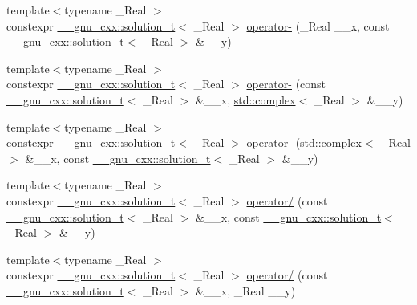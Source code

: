 \begin{DoxyCompactItemize}
\item 
{\footnotesize template$<$typename \+\_\+\+Real $>$ }\\constexpr \hyperlink{namespace____gnu__cxx_ae20ea642de50eb361074c62676b0159c}{\+\_\+\+\_\+gnu\+\_\+cxx\+::solution\+\_\+t}$<$ \+\_\+\+Real $>$ \hyperlink{namespacestd_ae02c419877b95950c8c9630c6a4971a1}{operator-\/} (\+\_\+\+Real \+\_\+\+\_\+x, const \hyperlink{namespace____gnu__cxx_ae20ea642de50eb361074c62676b0159c}{\+\_\+\+\_\+gnu\+\_\+cxx\+::solution\+\_\+t}$<$ \+\_\+\+Real $>$ \&\+\_\+\+\_\+y)
\item 
{\footnotesize template$<$typename \+\_\+\+Real $>$ }\\constexpr \hyperlink{namespace____gnu__cxx_ae20ea642de50eb361074c62676b0159c}{\+\_\+\+\_\+gnu\+\_\+cxx\+::solution\+\_\+t}$<$ \+\_\+\+Real $>$ \hyperlink{namespacestd_a308d96e2c3172aebb97f03880e8c5946}{operator-\/} (const \hyperlink{namespace____gnu__cxx_ae20ea642de50eb361074c62676b0159c}{\+\_\+\+\_\+gnu\+\_\+cxx\+::solution\+\_\+t}$<$ \+\_\+\+Real $>$ \&\+\_\+\+\_\+x, \hyperlink{classstd_1_1complex}{std\+::complex}$<$ \+\_\+\+Real $>$ \&\+\_\+\+\_\+y)
\item 
{\footnotesize template$<$typename \+\_\+\+Real $>$ }\\constexpr \hyperlink{namespace____gnu__cxx_ae20ea642de50eb361074c62676b0159c}{\+\_\+\+\_\+gnu\+\_\+cxx\+::solution\+\_\+t}$<$ \+\_\+\+Real $>$ \hyperlink{namespacestd_a4f4e9391eaa235d953faa99bff006e3d}{operator-\/} (\hyperlink{classstd_1_1complex}{std\+::complex}$<$ \+\_\+\+Real $>$ \&\+\_\+\+\_\+x, const \hyperlink{namespace____gnu__cxx_ae20ea642de50eb361074c62676b0159c}{\+\_\+\+\_\+gnu\+\_\+cxx\+::solution\+\_\+t}$<$ \+\_\+\+Real $>$ \&\+\_\+\+\_\+y)
\item 
{\footnotesize template$<$typename \+\_\+\+Real $>$ }\\constexpr \hyperlink{namespace____gnu__cxx_ae20ea642de50eb361074c62676b0159c}{\+\_\+\+\_\+gnu\+\_\+cxx\+::solution\+\_\+t}$<$ \+\_\+\+Real $>$ \hyperlink{namespacestd_aea656103e37e932d00b9980288f00fac}{operator/} (const \hyperlink{namespace____gnu__cxx_ae20ea642de50eb361074c62676b0159c}{\+\_\+\+\_\+gnu\+\_\+cxx\+::solution\+\_\+t}$<$ \+\_\+\+Real $>$ \&\+\_\+\+\_\+x, const \hyperlink{namespace____gnu__cxx_ae20ea642de50eb361074c62676b0159c}{\+\_\+\+\_\+gnu\+\_\+cxx\+::solution\+\_\+t}$<$ \+\_\+\+Real $>$ \&\+\_\+\+\_\+y)
\item 
{\footnotesize template$<$typename \+\_\+\+Real $>$ }\\constexpr \hyperlink{namespace____gnu__cxx_ae20ea642de50eb361074c62676b0159c}{\+\_\+\+\_\+gnu\+\_\+cxx\+::solution\+\_\+t}$<$ \+\_\+\+Real $>$ \hyperlink{namespacestd_a303ec56de26f2f2490f5bbd085ab48f1}{operator/} (const \hyperlink{namespace____gnu__cxx_ae20ea642de50eb361074c62676b0159c}{\+\_\+\+\_\+gnu\+\_\+cxx\+::solution\+\_\+t}$<$ \+\_\+\+Real $>$ \&\+\_\+\+\_\+x, \+\_\+\+Real \+\_\+\+\_\+y)

\end{DoxyCompactItemize}
